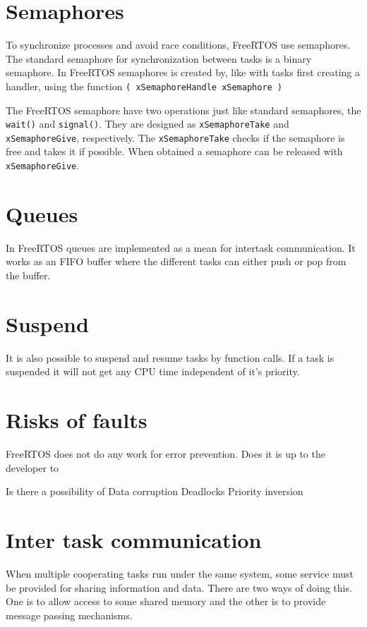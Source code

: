 \section{ Semaphores }

To synchronize processes and avoid race conditions, FreeRTOS use semaphores. The standard semaphore for synchronization between tasks is a binary semaphore. In FreeRTOS semaphores is created by, like with tasks first creating a handler, using the function \texttt{( xSemaphoreHandle xSemaphore )}

The FreeRTOS semaphore have two operations just like standard semaphores, the \texttt{wait()} and \texttt{signal()}. They are designed as \texttt{xSemaphoreTake} and \texttt{xSemaphoreGive}, respectively. The \texttt{xSemaphoreTake} checks if the semaphore is free and takes it if possible.
When obtained a semaphore can be released with \texttt{xSemaphoreGive}.

\section{ Queues }

In FreeRTOS queues are implemented as a mean for intertask communication. It works as an FIFO buffer where the different tasks can either push or pop from the buffer.

\section{ Suspend }
It is also possible to suspend and resume tasks by function calls. If a task is suspended it will not get any CPU time independent of it's priority.

\section{Risks of faults}

FreeRTOS does not do any work for error prevention. Does it is up to the developer to 

Is there a possibility of 
Data corruption
Deadlocks
Priority inversion



\section{Inter task communication}
When multiple cooperating tasks run under the same system, some service must be
provided for sharing information and data. There are two ways of doing this. One
is to allow access to some shared memory and the other is to provide message
passing mechanisms.

